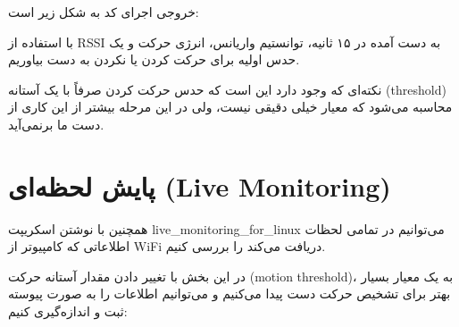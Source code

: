 \documentclass[12pt, a4paper]{article}
\newcommand{\lr}[1]{\foreignlanguage{english}{#1}}
\begin{document}
خروجی اجرای کد به شکل زیر است:

\begin{otherlanguage}{english}
\end{otherlanguage}

با استفاده از \lr{RSSI} به دست آمده در ۱۵ ثانیه، توانستیم واریانس، انرژی حرکت و یک حدس اولیه برای حرکت کردن یا نکردن به دست بیاوریم. 

نکته‌ای که وجود دارد این است که حدس حرکت کردن صرفاً با یک آستانه (\lr{threshold}) محاسبه می‌شود که معیار خیلی دقیقی نیست، ولی در این مرحله بیشتر از این کاری از دست ما برنمی‌آید.

\section{پایش لحظه‌ای (\lr{Live Monitoring})}
همچنین با نوشتن اسکریپت \lr{live\_monitoring\_for\_linux} می‌توانیم در تمامی لحظات اطلاعاتی که کامپیوتر از \lr{WiFi} دریافت می‌کند را بررسی کنیم. 

در این بخش با تغییر دادن مقدار آستانه حرکت (\lr{motion threshold})، به یک معیار بسیار بهتر برای تشخیص حرکت دست پیدا می‌کنیم و می‌توانیم اطلاعات را به صورت پیوسته ثبت و اندازه‌گیری کنیم:
\end{document}
